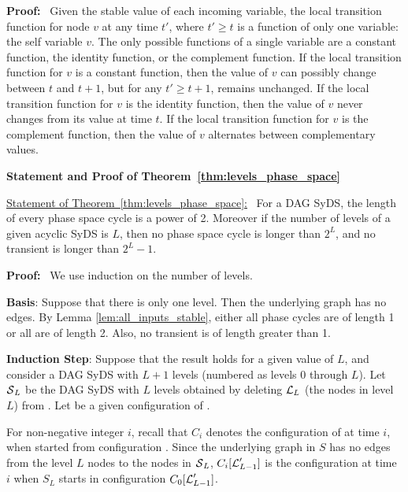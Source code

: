 \medskip

\noindent
\textbf{Proof:}~
Given the stable value of each incoming variable, the local transition
function for node $v$ at any time $t'$, where $t' \geq t$ is a
function of only one variable: the self variable $v$.  The only
possible functions of a single variable are a constant function,
the identity function, or the complement function.  If the local
transition function for $v$ is a constant function, then the value
of $v$ can possibly change between $t$ and $t+1$, but for any $t'
\geq t+1$, remains unchanged.  If the local transition function for
$v$ is the identity function, then the value of $v$ never changes
from its value at time $t$.  If the local transition function for
$v$ is the complement function, then the value of $v$ alternates
between complementary values.  \QED

\medskip

\noindent
\textbf{Statement and Proof of Theorem~\ref{thm:levels_phase_space}}

\medskip

\noindent
\underline{Statement of Theorem~\ref{thm:levels_phase_space}:}~
For a DAG SyDS,
the length of every phase space cycle is a power of 2.
Moreover if the number of levels of a given acyclic SyDS is $L$,
then no phase space cycle is longer than $2^L$,
and no transient is longer than $2^L-1$.

\medskip

\noindent
\textbf{Proof:}~ We use induction on the number of levels.

\smallskip

\noindent
{\bf Basis}: Suppose that there is only one level.
Then the underlying  graph has no edges.
By Lemma \ref{lem:all_inputs_stable},
either all phase cycles are of length 1 or all are of length 2. 
Also, no transient is of length greater than 1.

\smallskip

\noindent
{\bf Induction Step}: Suppose that the result holds for a given value of $L$,
and consider a DAG SyDS \cals{} with $L+1$ levels (numbered as levels 0 through $L$).
Let $\mbox{$\mathcal{S}$}_L$ be the DAG SyDS with $L$ levels obtained 
by deleting $\mbox{$\mathcal{L}$}_L$ (the nodes in level $L$) from \cals{}.
Let \calc{} be a given configuration of \cals{}.

\smallskip

For non-negative integer $i$, 
recall that $C_i$ denotes the configuration of \cals{} at time $i$, 
when started from configuration \calc{}.
Since the underlying graph in $S$ has 
no edges from the level $L$ nodes to the nodes in $\mbox{$\mathcal{S}$}_L$,
$C_i[\mbox{$\mathcal{L}$}_{L-1}']$ is the configuration at time $i$ 
when $S_L$ starts in configuration $C_0[\mbox{$\mathcal{L}$}_{L-1}']$.

